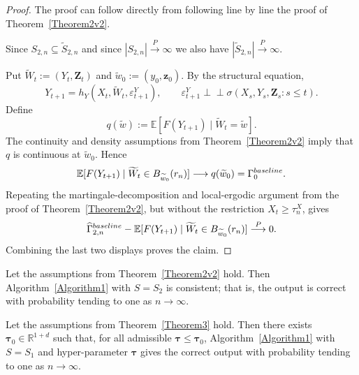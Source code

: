 \documentclass[a4paper,11pt]{article}
\newenvironment{customlem}[1]
  {\renewcommand\theinnercustomlem{#1}\innercustomlem}
  {\endinnercustomlem}
\newcommand{\baseline}{{\rm baseline}}
\begin{document}
\begin{proof}
The proof can follow directly from following line by line the proof of Theorem~\ref{Theorem2v2}. 

Since \(S_{2,n}\subseteq \widetilde S_{2,n}\) and since \(|S_{2,n}|\overset{P}{\to}\infty\) we also have \(
    |\widetilde S_{2,n}|\overset{P}{\to}\infty .
\)

Put \(\widetilde W_t:=(Y_t,\mathbf Z_t)\) and
\(\widetilde w_0:=(y_0,\mathbf z_0)\). By the structural equation,
\[
    Y_{t+1}
    =
    h_Y(X_t,\widetilde W_t,\varepsilon^Y_{t+1}),
    \qquad
    \varepsilon^Y_{t+1}\perp\!\!\!\perp \sigma(X_s,Y_s,\mathbf Z_s:s\leq t).
\]
Define
\[
    q(\widetilde w)
    :=
    \mathbb E[
        F(Y_{t+1})\mid \widetilde W_t=\widetilde w
    ].
\]
The continuity and density assumptions from Theorem~\ref{Theorem2v2} imply that
\(q\) is continuous at \(\widetilde w_0\). Hence
\[
    \mathbb E[
        F(Y_{t+1})
        \mid
        \widetilde W_t\in B_{\widetilde w_0}(r_n)
    ]
    \longrightarrow
    q(\widetilde w_0)
    =
    \Gamma^{\baseline}_0 .
\]
Repeating the martingale-decomposition and local-ergodic argument from the proof of
Theorem~\ref{Theorem2v2}, but without the restriction \(X_t\geq\tau_n^X\), gives
\[
    \widehat\Gamma^{\baseline}_{2,n}
    -
    \mathbb E[
        F(Y_{t+1})
        \mid
        \widetilde W_t\in B_{\widetilde w_0}(r_n)
    ]
    \overset{P}{\longrightarrow}0 .
\]
Combining the last two displays proves the claim.
\end{proof}


\begin{customlem}{\ref{Classification_lemma}}
Let the assumptions from Theorem~\ref{Theorem2v2} hold. Then
Algorithm~\ref{Algorithm1} with \(S=S_2\) is consistent; that is, the output is
correct with probability tending to one as \(n\to\infty\).

Let the assumptions from Theorem~\ref{Theorem3} hold. Then there exists
\(\boldsymbol{\tau}_0\in\mathbb R^{1+d}\) such that, for all admissible
\(\boldsymbol{\tau}\leq\boldsymbol{\tau}_0\), Algorithm~\ref{Algorithm1} with
\(S=S_1\) and hyper-parameter \(\boldsymbol{\tau}\) gives the correct output with
probability tending to one as \(n\to\infty\).
\end{customlem}
\end{document}

